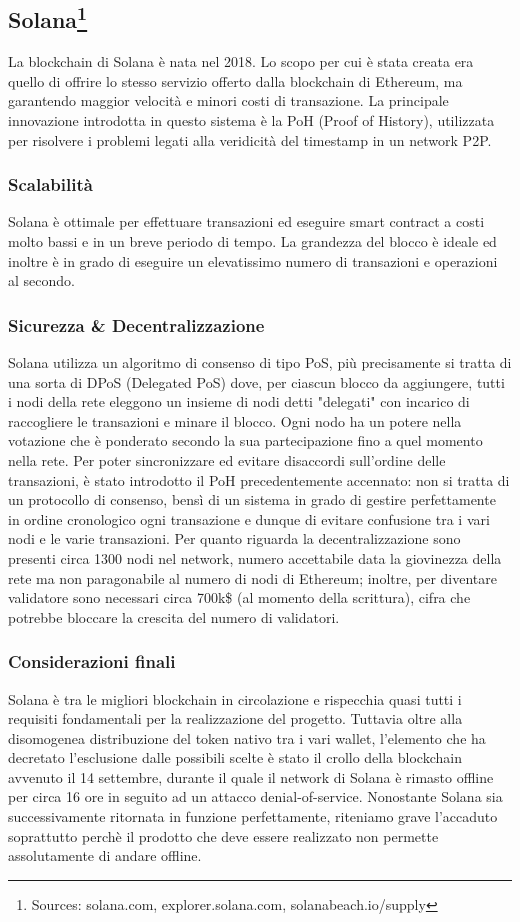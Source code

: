 \documentclass[a4paper, 12pt]{article}
\begin{document}
\newpage
\subsection*{Solana\footnote{Sources: solana.com, explorer.solana.com, solanabeach.io/supply}}
La blockchain di Solana è nata nel 2018. Lo scopo per cui è stata creata era quello di offrire lo stesso servizio offerto dalla blockchain di Ethereum, ma garantendo maggior velocità e minori costi di transazione. La principale innovazione introdotta in questo sistema è la PoH (Proof of History), utilizzata per risolvere i problemi legati alla veridicità del timestamp in un network P2P.
\subsubsection*{Scalabilità}
Solana è ottimale per effettuare transazioni ed eseguire smart contract a costi molto bassi e in un breve periodo di tempo. La grandezza del blocco è ideale ed inoltre è in grado di eseguire un elevatissimo numero di transazioni e operazioni al secondo.
\subsubsection*{Sicurezza \& Decentralizzazione}
Solana utilizza un algoritmo di consenso di tipo PoS, più precisamente si tratta di una sorta di DPoS (Delegated PoS) dove, per ciascun blocco da aggiungere, tutti i nodi della rete eleggono un insieme di nodi detti "delegati" con incarico di raccogliere le transazioni e minare il blocco. Ogni nodo ha un potere nella votazione che è ponderato secondo la sua partecipazione fino a quel momento nella rete. Per poter sincronizzare ed evitare disaccordi sull'ordine delle transazioni, è stato introdotto il PoH precedentemente accennato: non si tratta di un protocollo di consenso, bensì di un sistema in grado di gestire perfettamente in ordine cronologico ogni transazione e dunque di evitare confusione tra i vari nodi e le varie transazioni. Per quanto riguarda la decentralizzazione sono presenti circa 1300 nodi nel network, numero accettabile data la giovinezza della rete ma non paragonabile al numero di nodi di Ethereum; inoltre, per diventare validatore sono necessari circa 700k\$ (al momento della scrittura), cifra che potrebbe bloccare la crescita del numero di validatori.
\subsubsection*{Considerazioni finali}
Solana è tra le migliori blockchain in circolazione e rispecchia quasi tutti i requisiti fondamentali per la realizzazione del progetto. Tuttavia oltre alla disomogenea distribuzione del token nativo tra i vari wallet, l'elemento che ha decretato l'esclusione dalle possibili scelte è stato il crollo della blockchain avvenuto il 14 settembre, durante il quale il network di Solana è rimasto offline per circa 16 ore in seguito ad un attacco denial-of-service. Nonostante Solana sia successivamente ritornata in funzione perfettamente, riteniamo grave l'accaduto soprattutto perchè il prodotto che deve essere realizzato non permette assolutamente di andare offline.
\newpage
\end{document}
